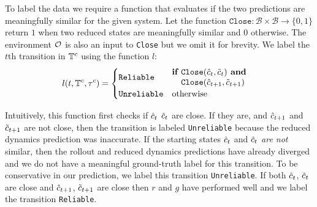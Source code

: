 To label the data we require a function that evaluates if the two predictions are meaningfully similar for the given system. Let the function $\texttt{Close}:\mathcal{B} \times \mathcal{B} \rightarrow \{0,1\}$ return $1$ when two reduced states are meaningfully similar and $0$ otherwise. The environment $\mathcal{O}$ is also an input to \texttt{Close} but we omit it for brevity. We label the $t$th transition in $\mathbb{T}^c$ using the function $l$:
\begin{equation}
    \begin{aligned}
    l(t,\mathbb{T}^c,\tau^c) &= \begin{cases} 
        \texttt{Reliable}   &  \begin{aligned}\textbf{if } & \texttt{Close}(\hat{c}_t, \tilde{c}_t) \textbf{ and} \\ 
                                                           & \texttt{Close}(\hat{c}_{t+1}, \tilde{c}_{t+1})\end{aligned} \\
        \texttt{Unreliable} & \mbox{otherwise} \end{cases}
    \end{aligned}
    \label{eqn:labeling}
\end{equation}

Intuitively, this function first checks if $\hat{c}_t$ $\tilde{c}_t$ are close. If they are, and $\hat{c}_{t+1}$ and $\tilde{c}_{t+1}$ are not close, then the transition is labeled \texttt{Unreliable} because the reduced dynamics prediction was inaccurate. If the starting states $\hat{c}_t$ and $\tilde{c}_t$ \textit{are not} similar, then the rollout and reduced dynamics predictions have already diverged and we do not have a meaningful ground-truth label for this transition. To be conservative in our prediction, we label this transition \texttt{Unreliable}. If both $\hat{c}_t$, $\tilde{c}_t$ are close and $\hat{c}_{t+1}$, $\tilde{c}_{t+1}$ are close then $r$ and $g$ have performed well and we label the transition \texttt{Reliable}.

